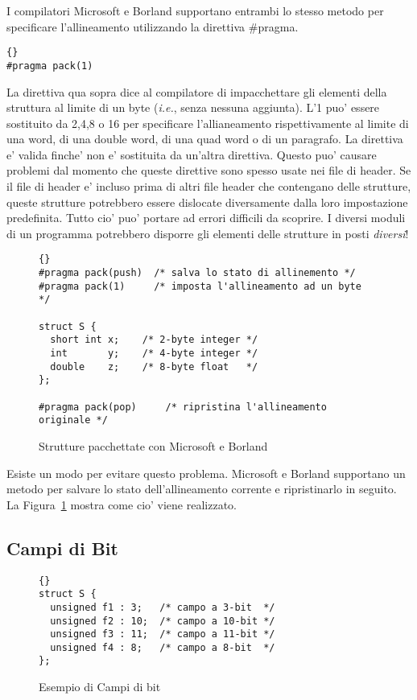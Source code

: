 I compilatori Microsoft e Borland supportano entrambi lo stesso metodo
per specificare l'allineamento utilizzando la direttiva {\code \#pragma}.
\begin{lstlisting}[stepnumber=0]{}
#pragma pack(1)
\end{lstlisting}
La direttiva qua sopra dice al compilatore di impacchettare gli elementi
della struttura al limite di un byte (\emph{i.e.}, senza nessuna aggiunta).
L'1 puo' essere sostituito da 2,4,8 o 16 per specificare l'allianeamento
rispettivamente al limite di una word, di una double word, di una
quad word o di un paragrafo. La direttiva e' valida finche' non e'
sostituita da un'altra direttiva. Questo puo' causare problemi  dal 
momento che queste direttive sono spesso usate nei file di header.
Se il file di header e' incluso prima di altri file header che contengano
delle strutture, queste strutture potrebbero essere dislocate 
diversamente dalla loro impostazione predefinita. Tutto cio' puo'
portare ad errori difficili da scoprire. I diversi moduli di un 
programma potrebbero disporre gli elementi delle strutture in 
posti \emph{diversi}!

\begin{figure}[t]
\begin{lstlisting}[frame=tlrb,stepnumber=0]{}
#pragma pack(push)  /* salva lo stato di allinemento */
#pragma pack(1)     /* imposta l'allineamento ad un byte  */

struct S {
  short int x;    /* 2-byte integer */
  int       y;    /* 4-byte integer */
  double    z;    /* 8-byte float   */
};

#pragma pack(pop)     /* ripristina l'allineamento originale */
\end{lstlisting}
\caption{Strutture pacchettate con Microsoft e Borland \label{fig:msPacked}}
\end{figure}

Esiste un modo per evitare questo problema. Microsoft e Borland supportano
un metodo per salvare lo stato dell'allineamento corrente e ripristinarlo
in seguito. La Figura~\ref{fig:msPacked} mostra come cio' viene
realizzato.

\subsection{Campi di Bit}

\begin{figure}[t]
\begin{lstlisting}[frame=tlrb,stepnumber=0]{}
struct S {
  unsigned f1 : 3;   /* campo a 3-bit  */
  unsigned f2 : 10;  /* campo a 10-bit */
  unsigned f3 : 11;  /* campo a 11-bit */
  unsigned f4 : 8;   /* campo a 8-bit  */
};
\end{lstlisting}
\caption{Esempio di Campi di bit \label{fig:bitStruct}}
\end{figure}

